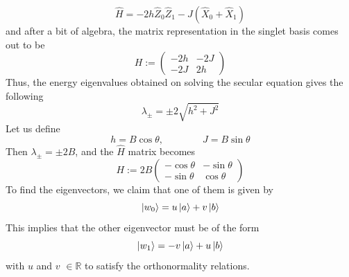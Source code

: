 \documentclass[../thesis_main.tex]{subfiles}
\begin{document}
\begin{equation}
    \hat{H} = - 2h \hat{Z}_0 \hat{Z}_1 - J(\hat{X}_0 + \hat{X}_1)
\end{equation}
and after a bit of algebra, the matrix representation in the singlet basis comes out to be
\begin{equation}
    H:= \left(\begin{array}{cc}
    -2h & -2J \\ 
    -2J & 2h
    \end{array}\right)
\end{equation}
Thus, the energy eigenvalues obtained on solving the secular equation gives the following
\begin{equation}
    \lambda_\pm = \pm 2 \sqrt{h^2 + J^2}
\end{equation}
Let us define 
\begin{equation}
    h = B \cos \theta, \qquad \qquad J = B \sin \theta
\end{equation}
Then $\lambda_\pm = \pm 2B$, and the $\hat{H}$ matrix becomes
\begin{equation}
    H := 2B \left(\begin{array}{cc}
    -\cos \theta  & -\sin \theta  \\ 
    -\sin \theta  & \cos \theta 
    \end{array}\right)
\end{equation}
To find the eigenvectors, we claim that one of them is given by 
\begin{equation}
    \ket{w_0} = u \ket{a} + v \ket{b}
\end{equation}
This implies that the other eigenvector must be of the form
\begin{equation}
    \ket{w_1} = -v \ket{a} + u \ket{b}
\end{equation}
with $u$ and $v$ $\in \mathbb{R}$ to satisfy the orthonormality relations. 
\end{document}
